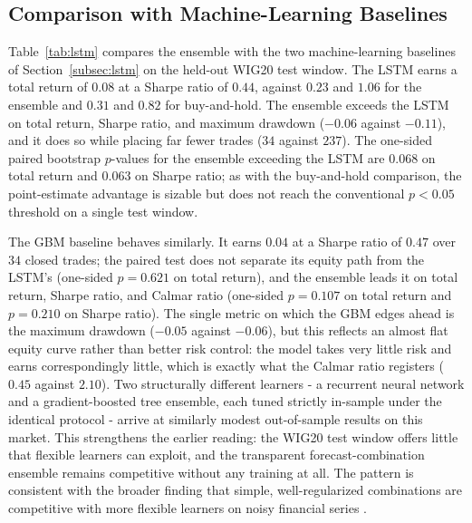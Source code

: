 \documentclass{ieeeaccess}
\newcommand{\TRtest}{\ensuremath{0.23}}
\newcommand{\Shtest}{\ensuremath{1.06}}
\newcommand{\MDDtest}{\ensuremath{-0.06}}
\newcommand{\Calmtest}{\ensuremath{2.10}}
\newcommand{\Ntrades}{\ensuremath{34}}
\newcommand{\BHtest}{\ensuremath{0.31}}
\newcommand{\BHsharpe}{\ensuremath{0.82}}
\newcommand{\LSTMtest}{\ensuremath{0.08}}
\newcommand{\LSTMsharpe}{\ensuremath{0.44}}
\newcommand{\LSTMmdd}{\ensuremath{-0.11}}
\newcommand{\LSTMtrades}{\ensuremath{237}}
\newcommand{\PensVsLSTM}{\ensuremath{0.068}}
\newcommand{\PensVsLSTMsharpe}{\ensuremath{0.063}}
\newcommand{\GBMtest}{\ensuremath{0.04}}
\newcommand{\GBMsharpe}{\ensuremath{0.47}}
\newcommand{\GBMmdd}{\ensuremath{-0.05}}
\newcommand{\GBMcalmar}{\ensuremath{0.45}}
\newcommand{\GBMtrades}{\ensuremath{34}}
\newcommand{\PensVsGBM}{\ensuremath{0.107}}
\newcommand{\PensVsGBMsharpe}{\ensuremath{0.210}}
\newcommand{\PGBMvsLSTM}{\ensuremath{0.621}}
\begin{document}
\subsection{Comparison with Machine-Learning Baselines}
\label{subsec:lstm_results}

Table~\ref{tab:lstm} compares the ensemble with the two machine-learning baselines of Section~\ref{subsec:lstm} on the held-out WIG20 test window. The LSTM earns a total return of \LSTMtest{} at a Sharpe ratio of \LSTMsharpe{}, against \TRtest{} and \Shtest{} for the ensemble and \BHtest{} and \BHsharpe{} for buy-and-hold. The ensemble exceeds the LSTM on total return, Sharpe ratio, and maximum drawdown (\MDDtest{} against \LSTMmdd{}), and it does so while placing far fewer trades (\Ntrades{} against \LSTMtrades{}). The one-sided paired bootstrap $p$-values for the ensemble exceeding the LSTM are \PensVsLSTM{} on total return and \PensVsLSTMsharpe{} on Sharpe ratio; as with the buy-and-hold comparison, the point-estimate advantage is sizable but does not reach the conventional $p < 0.05$ threshold on a single test window.

The GBM baseline behaves similarly. It earns \GBMtest{} at a Sharpe ratio of \GBMsharpe{} over \GBMtrades{} closed trades; the paired test does not separate its equity path from the LSTM's (one-sided $p = \PGBMvsLSTM{}$ on total return), and the ensemble leads it on total return, Sharpe ratio, and Calmar ratio (one-sided $p = \PensVsGBM{}$ on total return and $p = \PensVsGBMsharpe{}$ on Sharpe ratio). The single metric on which the GBM edges ahead is the maximum drawdown (\GBMmdd{} against \MDDtest{}), but this reflects an almost flat equity curve rather than better risk control: the model takes very little risk and earns correspondingly little, which is exactly what the Calmar ratio registers (\GBMcalmar{} against \Calmtest{}). Two structurally different learners - a recurrent neural network and a gradient-boosted tree ensemble, each tuned strictly in-sample under the identical protocol - arrive at similarly modest out-of-sample results on this market. This strengthens the earlier reading: the WIG20 test window offers little that flexible learners can exploit, and the transparent forecast-combination ensemble remains competitive without any training at all. The pattern is consistent with the broader finding that simple, well-regularized combinations are competitive with more flexible learners on noisy financial series \cite{clemen1989,timmermann2006}.
\end{document}
